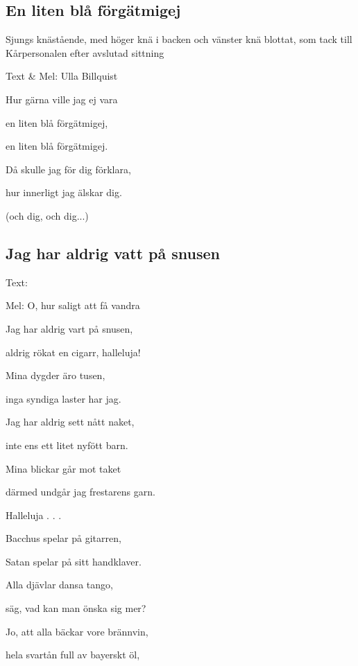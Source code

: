 

\pagestyle{Bordsvisor}



\subsection{\textbf{En liten blå förgätmigej}}

Sjungs knästående, med höger knä i backen och vänster knä
blottat, som tack till Kårpersonalen efter avslutad sittning

Text \& Mel: Ulla Billquist\bigskip

Hur gärna ville jag ej vara

en liten blå förgätmigej,

en liten blå förgätmigej.

Då skulle jag för dig förklara,

hur innerligt jag älskar dig.

(och dig, och dig...)

\subsection{\textbf{Jag har aldrig vatt på snusen }}

Text: 

Mel: O, hur saligt att få vandra \bigskip


Jag har aldrig vart på snusen,

aldrig rökat en cigarr, halleluja!

Mina dygder äro tusen,

inga syndiga laster har jag.

Jag har aldrig sett nått naket,

inte ens ett litet nyfött barn.

Mina blickar går mot taket

därmed undgår jag frestarens garn.

Halleluja . . .\bigskip

Bacchus spelar på gitarren,

Satan spelar på sitt handklaver.

Alla djävlar dansa tango,

säg, vad kan man önska sig mer?

Jo, att alla bäckar vore brännvin,

hela svartån full av bayerskt öl,


